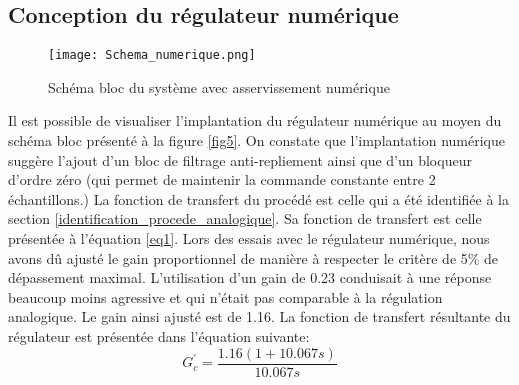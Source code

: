 \subsection{Conception du régulateur numérique}
\begin{figure}[htbp]
\centering
\texttt{[image: Schema\_numerique.png]}
\caption{Schéma bloc du système avec asservissement numérique}
\label{fig7}
\end{figure}
Il est possible de visualiser l'implantation du régulateur numérique au moyen du schéma bloc présenté à la figure \ref{fig5}. On constate que l'implantation numérique suggère l'ajout d'un bloc de filtrage anti-repliement ainsi que d'un bloqueur d'ordre zéro (qui permet de maintenir la commande constante entre 2 échantillons.) La fonction de transfert du procédé est celle qui a été identifiée à la section \ref{identification_procede_analogique}. Sa fonction de transfert est celle présentée à l'équation \ref{eq1}. Lors des essais avec le régulateur numérique, nous avons dû ajusté le gain proportionnel de manière à respecter le critère de 5\% de dépassement maximal. L'utilisation d'un gain de 0.23 conduisait à une réponse beaucoup moins agressive et qui n'était pas comparable à la régulation analogique. Le gain ainsi ajusté est de 1.16. La fonction de transfert résultante du régulateur est présentée dans l'équation suivante:
\begin{equation}
G_c^{'} = \frac{1.16(1 + 10.067s)}{10.067s}
\end{equation}
